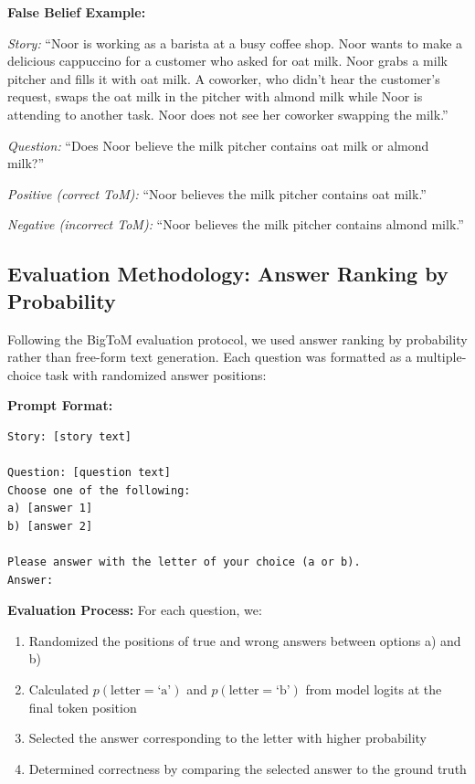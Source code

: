 \documentclass[letterpaper]{article}
\begin{document}
\textbf{False Belief Example:}

\textit{Story:} ``Noor is working as a barista at a busy coffee shop. Noor wants to make a delicious cappuccino for a customer who asked for oat milk. Noor grabs a milk pitcher and fills it with oat milk. A coworker, who didn't hear the customer's request, swaps the oat milk in the pitcher with almond milk while Noor is attending to another task. Noor does not see her coworker swapping the milk.''

\textit{Question:} ``Does Noor believe the milk pitcher contains oat milk or almond milk?''

\textit{Positive (correct ToM):} ``Noor believes the milk pitcher contains oat milk.''

\textit{Negative (incorrect ToM):} ``Noor believes the milk pitcher contains almond milk.''

\subsection{Evaluation Methodology: Answer Ranking by Probability}

Following the BigToM evaluation protocol, we used answer ranking by probability rather than free-form text generation. Each question was formatted as a multiple-choice task with randomized answer positions:

\textbf{Prompt Format:}
\begin{verbatim}
Story: [story text]

Question: [question text]
Choose one of the following:
a) [answer 1]
b) [answer 2]

Please answer with the letter of your choice (a or b).
Answer:
\end{verbatim}

\textbf{Evaluation Process:}
For each question, we:
\begin{enumerate}
    \item Randomized the positions of true and wrong answers between options a) and b)
    \item Calculated $p(\text{letter}=\text{`a'})$ and $p(\text{letter}=\text{`b'})$ from model logits at the final token position
    \item Selected the answer corresponding to the letter with higher probability
    \item Determined correctness by comparing the selected answer to the ground truth
\end{enumerate}
\end{document}
